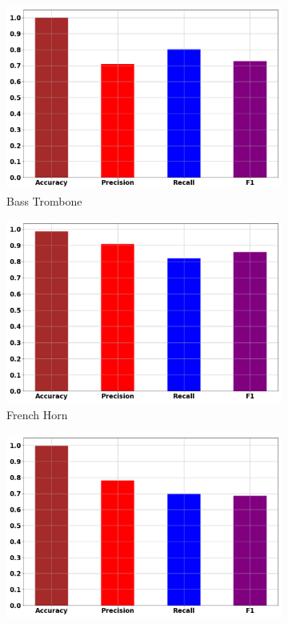 \documentclass[12pt,letterpaper]{article}
\begin{document}
\begin{figure}[H]
	\begin{subfigure}[b]{0.45\textwidth}
	\centering
	\includegraphics[width=\textwidth]{../FiguresClasses/BassTrombone}
	\caption{Bass Trombone}
	\end{subfigure}	
	\begin{subfigure}[b]{0.45\textwidth}
	\centering
	\includegraphics[width=\textwidth]{../FiguresClasses/Horn}
	\caption{French Horn}
	\end{subfigure}	
	\begin{subfigure}[b]{0.45\textwidth}
	\centering
	\includegraphics[width=\textwidth]{../FiguresClasses/TenorTrombone}

\end{subfigure}
\end{figure}
\end{document}
